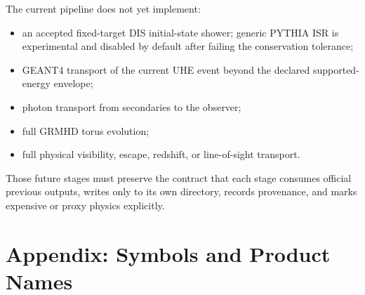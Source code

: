 \documentclass[11pt,a4paper]{report}
\numberwithin{equation}{chapter}
\begin{document}
The current pipeline does not yet implement:
\begin{itemize}
\item an accepted fixed-target DIS initial-state shower; generic PYTHIA ISR is
experimental and disabled by default after failing the conservation tolerance;
\item GEANT4 transport of the current UHE event beyond the declared
supported-energy envelope;
\item photon transport from secondaries to the observer;
\item full GRMHD torus evolution;
\item full physical visibility, escape, redshift, or line-of-sight transport.
\end{itemize}
Those future stages must preserve the contract that each stage consumes official
previous outputs, writes only to its own directory, records provenance, and
marks expensive or proxy physics explicitly.

\appendix
\chapter{Appendix: Symbols and Product Names}
\end{document}
